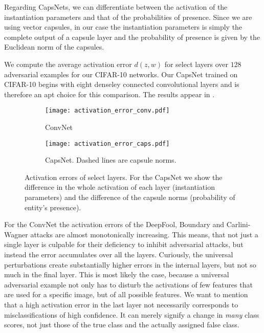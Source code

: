 Regarding CapsNets, we can differentiate between the activation of the instantiation parameters and that of the probabilities of presence.
Since we are using vector capsules, in our case the instantiation parameters is simply the complete output of a capsule layer and the probability of presence is given by the Euclidean norm of the capsules.

We compute the average activation error $d(z, w)$ for select layers over $128$ adversarial examples for our CIFAR-10 networks. Our CapsNet trained on CIFAR-10 begins with eight denseley connected convolutional layers and is therefore an apt choice for this comparison.
The results appear in .

\begin{figure}
	\centering
	
	\begin{subfigure}{.5\textwidth}
		\texttt{[image: activation\_error\_conv.pdf]}
		\caption{ConvNet}
	\end{subfigure}%
	\begin{subfigure}{.5\textwidth}
		\texttt{[image: activation\_error\_caps.pdf]}
		\caption{CapsNet. Dashed lines are capsule norms.}
	\end{subfigure}
	\caption[Activation errors]{Activation errors of select layers. For the CapsNet we show the difference in the whole activation of each layer (instantiation parameters) and the difference of the capsule norms (probability of entity's presence).}
	\label{fig:activation}
\end{figure}

For the ConvNet the activation errors of the DeepFool, Boundary and Carlini-Wagner attacks are almost monotonically increasing.
This means, that not just a single layer is culpable for their deficiency to inhibit adversarial attacks, but instead the error accumulates over all the layers.
Curiously, the universal perturbations create substantially higher errors in the internal layers, but not so much in the final layer.
This is most likely the case, because a universal adversarial example not only has to disturb the activations of few features that are used for a specific image, but of all possible features. 
We want to mention that a high activation error in the last layer not necessarily corresponds to misclassifications of high confidence.
It can merely signify a change in \emph{many} class scores, not just those of the true class and the actually assigned false class.

